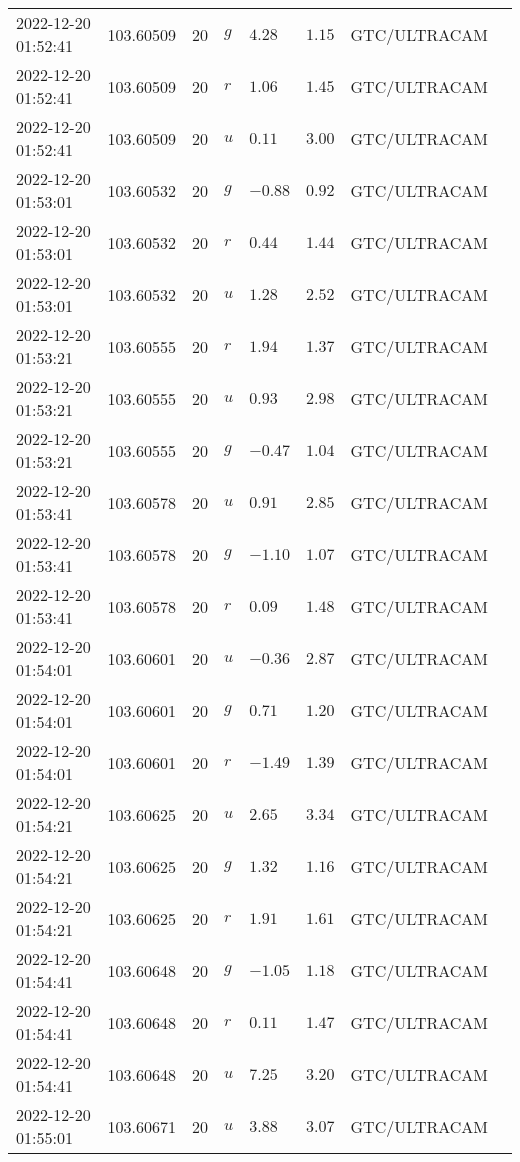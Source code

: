 \documentclass{nature_plusfigure}
\begin{document}
\begin{supplement}
\begin{center}
\begin{longtable}{llllllll}
2022-12-20 01:52:41 & 103.60509 & 20 & $g$ & $4.28$ & $1.15$ & GTC/ULTRACAM &  \\ 
2022-12-20 01:52:41 & 103.60509 & 20 & $r$ & $1.06$ & $1.45$ & GTC/ULTRACAM &  \\ 
2022-12-20 01:52:41 & 103.60509 & 20 & $u$ & $0.11$ & $3.00$ & GTC/ULTRACAM &  \\ 
2022-12-20 01:53:01 & 103.60532 & 20 & $g$ & $-0.88$ & $0.92$ & GTC/ULTRACAM &  \\ 
2022-12-20 01:53:01 & 103.60532 & 20 & $r$ & $0.44$ & $1.44$ & GTC/ULTRACAM &  \\ 
2022-12-20 01:53:01 & 103.60532 & 20 & $u$ & $1.28$ & $2.52$ & GTC/ULTRACAM &  \\ 
2022-12-20 01:53:21 & 103.60555 & 20 & $r$ & $1.94$ & $1.37$ & GTC/ULTRACAM &  \\ 
2022-12-20 01:53:21 & 103.60555 & 20 & $u$ & $0.93$ & $2.98$ & GTC/ULTRACAM &  \\ 
2022-12-20 01:53:21 & 103.60555 & 20 & $g$ & $-0.47$ & $1.04$ & GTC/ULTRACAM &  \\ 
2022-12-20 01:53:41 & 103.60578 & 20 & $u$ & $0.91$ & $2.85$ & GTC/ULTRACAM &  \\ 
2022-12-20 01:53:41 & 103.60578 & 20 & $g$ & $-1.10$ & $1.07$ & GTC/ULTRACAM &  \\ 
2022-12-20 01:53:41 & 103.60578 & 20 & $r$ & $0.09$ & $1.48$ & GTC/ULTRACAM &  \\ 
2022-12-20 01:54:01 & 103.60601 & 20 & $u$ & $-0.36$ & $2.87$ & GTC/ULTRACAM &  \\ 
2022-12-20 01:54:01 & 103.60601 & 20 & $g$ & $0.71$ & $1.20$ & GTC/ULTRACAM &  \\ 
2022-12-20 01:54:01 & 103.60601 & 20 & $r$ & $-1.49$ & $1.39$ & GTC/ULTRACAM &  \\ 
2022-12-20 01:54:21 & 103.60625 & 20 & $u$ & $2.65$ & $3.34$ & GTC/ULTRACAM &  \\ 
2022-12-20 01:54:21 & 103.60625 & 20 & $g$ & $1.32$ & $1.16$ & GTC/ULTRACAM &  \\ 
2022-12-20 01:54:21 & 103.60625 & 20 & $r$ & $1.91$ & $1.61$ & GTC/ULTRACAM &  \\ 
2022-12-20 01:54:41 & 103.60648 & 20 & $g$ & $-1.05$ & $1.18$ & GTC/ULTRACAM &  \\ 
2022-12-20 01:54:41 & 103.60648 & 20 & $r$ & $0.11$ & $1.47$ & GTC/ULTRACAM &  \\ 
2022-12-20 01:54:41 & 103.60648 & 20 & $u$ & $7.25$ & $3.20$ & GTC/ULTRACAM &  \\ 
2022-12-20 01:55:01 & 103.60671 & 20 & $u$ & $3.88$ & $3.07$ & GTC/ULTRACAM &  \\ 

\end{longtable}
\end{center}
\end{supplement}
\end{document}
